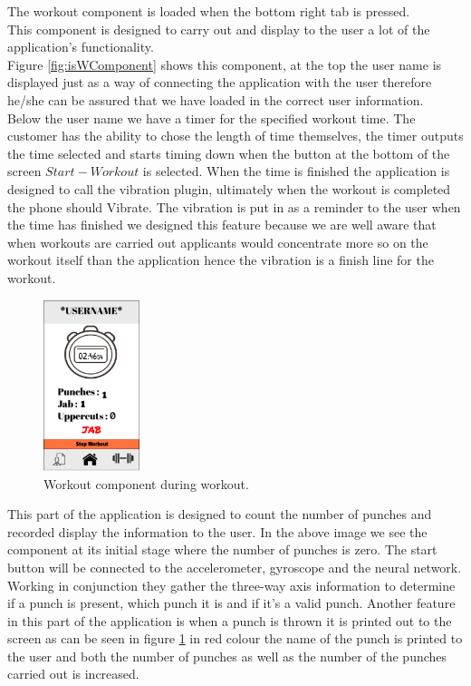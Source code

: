 \documentclass[a4paper,12pt]{report}
\begin{document}
The workout component is loaded when the bottom right tab is pressed.\\
This component is designed to carry out and display to the user a lot of the application's functionality.\\
Figure \ref{fig:isWComponent}  shows this component, at the top the user name is displayed just as a way of connecting the application with the user therefore he/she can be assured that we have loaded in the correct user information.\\
Below the user name we have a timer for the specified workout time. The customer has the ability to chose the length of time themselves, the timer outputs the time selected and starts timing down when the button at the bottom of the screen $Start-Workout$ is selected. When the time is finished the application is designed to call the vibration plugin, ultimately when the workout is completed the phone should Vibrate.
The vibration is put in as a reminder to the user when the time has finished we designed this feature because we are well aware that when workouts are carried out applicants would concentrate more so on the workout itself than the application hence the vibration is a finish line for the workout.
\newpage
\begin{figure}
\centering
\includegraphics[width=0.25\textwidth]{images/workoutAfterPunch.png}
\caption{\label{fig:ipWComponent}Workout component during workout.}
\end{figure}
This part of the application is designed to count the number of punches and recorded display the information to the user. In the above image we see the component at its initial stage where the number of punches is zero.
The start button will be connected to the accelerometer, gyroscope and the neural network. Working in conjunction they gather the three-way axis information to determine if a punch is present, which punch it is and if it's a valid punch.
Another feature in this part of the application is when a punch is thrown it is printed out to the screen as can be seen in figure  \ref{fig:ipWComponent} in red colour the name of the punch is printed to the user and both the number of punches as well as the number of the punches carried out is increased.
\end{document}
